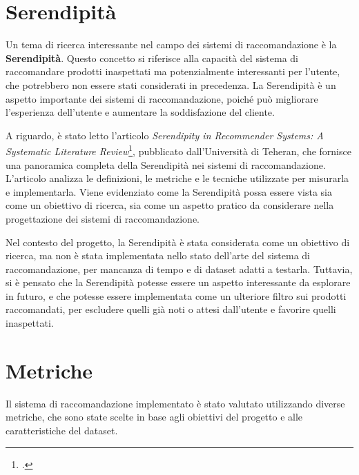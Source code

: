 \section{Serendipità}

Un tema di ricerca interessante nel campo dei sistemi di raccomandazione è la \textbf{Serendipità}. Questo concetto si riferisce alla capacità del sistema di raccomandare prodotti inaspettati ma potenzialmente interessanti per l'utente, che potrebbero non essere stati considerati in precedenza. La Serendipità è un aspetto importante dei sistemi di raccomandazione, poiché può migliorare l'esperienza dell'utente e aumentare la soddisfazione del cliente.

A riguardo, è stato letto l'articolo \emph{Serendipity in Recommender Systems: A Systematic Literature Review}\footcite{article:serendipity-recommender-systems}, pubblicato dall'Università di Teheran, che fornisce una panoramica completa della Serendipità nei sistemi di raccomandazione. L'articolo analizza le definizioni, le metriche e le tecniche utilizzate per misurarla e implementarla. Viene evidenziato come la Serendipità possa essere vista sia come un obiettivo di ricerca, sia come un aspetto pratico da considerare nella progettazione dei sistemi di raccomandazione.

Nel contesto del progetto, la Serendipità è stata considerata come un obiettivo di ricerca, ma non è stata implementata nello stato dell'arte del sistema di raccomandazione, per mancanza di tempo e di dataset adatti a testarla. Tuttavia, si è pensato che la Serendipità potesse essere un aspetto interessante da esplorare in futuro, e che potesse essere implementata come un ulteriore filtro sui prodotti raccomandati, per escludere quelli già noti o attesi dall'utente e favorire quelli inaspettati.


\section{Metriche}

Il sistema di raccomandazione implementato è stato valutato utilizzando diverse metriche, che sono state scelte in base agli obiettivi del progetto e alle caratteristiche del dataset.

